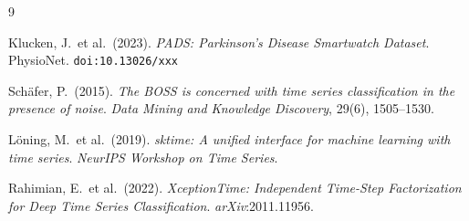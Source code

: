 \documentclass[12pt, a4paper]{article}
\begin{document}
\begin{thebibliography}{9}

  Klucken, J.\ et al.\ (2023).
  \textit{PADS: Parkinson's Disease Smartwatch Dataset}.
  PhysioNet.
  \texttt{doi:10.13026/xxx}

  Schäfer, P.\ (2015).
  \textit{The BOSS is concerned with time series classification
  in the presence of noise}.
  \textit{Data Mining and Knowledge Discovery}, 29(6), 1505--1530.

  Löning, M.\ et al.\ (2019).
  \textit{sktime: A unified interface for machine learning with
  time series}.
  \textit{NeurIPS Workshop on Time Series}.

  Rahimian, E.\ et al.\ (2022).
  \textit{XceptionTime: Independent Time-Step Factorization for
  Deep Time Series Classification}.
  \textit{arXiv}:2011.11956.

\end{thebibliography}
\end{document}

